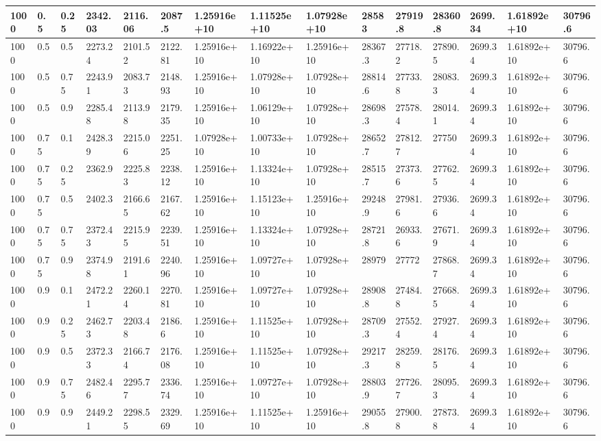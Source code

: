 \begin{table}[!htbp]
\begin{tabularx}{\textwidth}{|p{0.4cm}|*{2}{p{0.2cm}|}*{12}{X|}}
1000&0.5&0.25&2342.03&2116.06&2087.5&1.25916e+10&1.11525e+10&1.07928e+10&28583&27919.8&28360.8&2699.34&1.61892e+10&30796.6\\\hline
1000&0.5&0.5&2273.24&2101.52&2122.81&1.25916e+10&1.16922e+10&1.25916e+10&28367.3&27718.2&27890.5&2699.34&1.61892e+10&30796.6\\\hline
1000&0.5&0.75&2243.91&2083.73&2148.93&1.25916e+10&1.07928e+10&1.07928e+10&28814.6&27733.8&28083.3&2699.34&1.61892e+10&30796.6\\\hline
1000&0.5&0.9&2285.48&2113.98&2179.35&1.25916e+10&1.06129e+10&1.07928e+10&28698.3&27578.4&28014.1&2699.34&1.61892e+10&30796.6\\\hline
1000&0.75&0.1&2428.39&2215.06&2251.25&1.07928e+10&1.00733e+10&1.07928e+10&28652.7&27812.7&27750&2699.34&1.61892e+10&30796.6\\\hline
1000&0.75&0.25&2362.9&2225.83&2238.12&1.25916e+10&1.13324e+10&1.07928e+10&28515.7&27373.6&27762.5&2699.34&1.61892e+10&30796.6\\\hline
1000&0.75&0.5&2402.3&2166.65&2167.62&1.25916e+10&1.15123e+10&1.25916e+10&29248.9&27981.6&27936.6&2699.34&1.61892e+10&30796.6\\\hline
1000&0.75&0.75&2372.43&2215.95&2239.51&1.25916e+10&1.13324e+10&1.07928e+10&28721.8&26933.6&27671.9&2699.34&1.61892e+10&30796.6\\\hline
1000&0.75&0.9&2374.98&2191.61&2240.96&1.25916e+10&1.09727e+10&1.07928e+10&28979&27772&27868.7&2699.34&1.61892e+10&30796.6\\\hline
1000&0.9&0.1&2472.21&2260.14&2270.81&1.25916e+10&1.09727e+10&1.07928e+10&28908.8&27484.8&27668.5&2699.34&1.61892e+10&30796.6\\\hline
1000&0.9&0.25&2462.73&2203.48&2186.6&1.25916e+10&1.11525e+10&1.07928e+10&28709.3&27552.4&27927.4&2699.34&1.61892e+10&30796.6\\\hline
1000&0.9&0.5&2372.33&2166.74&2176.08&1.25916e+10&1.11525e+10&1.07928e+10&29217.3&28259.8&28176.5&2699.34&1.61892e+10&30796.6\\\hline
1000&0.9&0.75&2482.46&2295.77&2336.74&1.25916e+10&1.09727e+10&1.07928e+10&28803.9&27726.7&28095.3&2699.34&1.61892e+10&30796.6\\\hline
1000&0.9&0.9&2449.21&2298.55&2329.69&1.25916e+10&1.11525e+10&1.25916e+10&29055.8&27900.8&27873.8&2699.34&1.61892e+10&30796.6\\\hline
	\end{tabularx}
\end{table}

